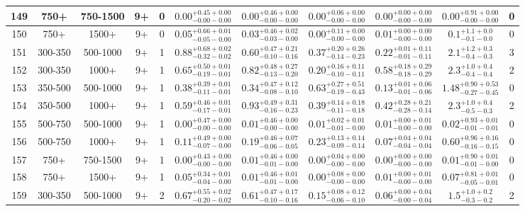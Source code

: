 \documentclass[11pt, oneside]{article}
\begin{document}
\begin{table}
{\begin{tabular}{ |c|c|c|c|c||c|c|c|c||c|c| }
149 & 750+ & 750-1500 & 9+ & 0 & $0.00^{+0.45+0.00}_{-0.00-0.00}$ & $0.00^{+0.46+0.00}_{-0.00-0.00}$ & $0.00^{+0.06+0.00}_{-0.00-0.00}$ & $0.00^{+0.00+0.00}_{-0.00-0.00}$ & $0.00^{+0.91+0.00}_{-0.00-0.00}$ & 0 \\ \hline
150 & 750+ & 1500+ & 9+ & 0 & $0.05^{+0.66+0.01}_{-0.05-0.00}$ & $0.03^{+0.46+0.02}_{-0.03-0.00}$ & $0.00^{+0.11+0.00}_{-0.00-0.00}$ & $0.01^{+0.00+0.00}_{-0.00-0.00}$ & $0.1^{+1.1+0.0}_{-0.1-0.0}$ & 0 \\ \hline
151 & 300-350 & 500-1000 & 9+ & 1 & $0.88^{+0.68+0.02}_{-0.32-0.02}$ & $0.60^{+0.47+0.21}_{-0.10-0.16}$ & $0.37^{+0.20+0.26}_{-0.14-0.23}$ & $0.22^{+0.01+0.11}_{-0.01-0.11}$ & $2.1^{+1.2+0.3}_{-0.4-0.3}$ & 3 \\ \hline
152 & 300-350 & 1000+ & 9+ & 1 & $0.65^{+0.50+0.01}_{-0.19-0.01}$ & $0.82^{+0.48+0.27}_{-0.13-0.20}$ & $0.20^{+0.16+0.11}_{-0.10-0.11}$ & $0.58^{+0.18+0.29}_{-0.18-0.29}$ & $2.3^{+1.0+0.4}_{-0.4-0.4}$ & 2 \\ \hline
153 & 350-500 & 500-1000 & 9+ & 1 & $0.38^{+0.39+0.01}_{-0.11-0.01}$ & $0.34^{+0.47+0.12}_{-0.08-0.10}$ & $0.63^{+0.27+0.51}_{-0.19-0.43}$ & $0.13^{+0.01+0.06}_{-0.01-0.06}$ & $1.48^{+0.90+0.53}_{-0.27-0.45}$ & 0 \\ \hline
154 & 350-500 & 1000+ & 9+ & 1 & $0.59^{+0.46+0.01}_{-0.17-0.01}$ & $0.93^{+0.49+0.31}_{-0.16-0.23}$ & $0.39^{+0.14+0.18}_{-0.11-0.18}$ & $0.42^{+0.28+0.21}_{-0.28-0.14}$ & $2.3^{+1.0+0.4}_{-0.5-0.3}$ & 2 \\ \hline
155 & 500-750 & 500-1000 & 9+ & 1 & $0.00^{+0.47+0.00}_{-0.00-0.00}$ & $0.01^{+0.46+0.00}_{-0.00-0.00}$ & $0.01^{+0.02+0.01}_{-0.01-0.00}$ & $0.01^{+0.00+0.01}_{-0.00-0.00}$ & $0.02^{+0.93+0.01}_{-0.01-0.01}$ & 0 \\ \hline
156 & 500-750 & 1000+ & 9+ & 1 & $0.11^{+0.49+0.00}_{-0.07-0.00}$ & $0.19^{+0.46+0.07}_{-0.06-0.05}$ & $0.23^{+0.13+0.14}_{-0.09-0.14}$ & $0.07^{+0.04+0.04}_{-0.04-0.04}$ & $0.60^{+0.96+0.16}_{-0.16-0.15}$ & 0 \\ \hline
157 & 750+ & 750-1500 & 9+ & 1 & $0.00^{+0.43+0.00}_{-0.00-0.00}$ & $0.01^{+0.46+0.00}_{-0.01-0.00}$ & $0.00^{+0.04+0.00}_{-0.00-0.00}$ & $0.00^{+0.00+0.00}_{-0.00-0.00}$ & $0.01^{+0.90+0.01}_{-0.01-0.00}$ & 0 \\ \hline
158 & 750+ & 1500+ & 9+ & 1 & $0.05^{+0.34+0.01}_{-0.04-0.00}$ & $0.01^{+0.46+0.01}_{-0.01-0.00}$ & $0.00^{+0.08+0.00}_{-0.00-0.00}$ & $0.01^{+0.00+0.01}_{-0.00-0.00}$ & $0.07^{+0.81+0.01}_{-0.05-0.01}$ & 0 \\ \hline
159 & 300-350 & 500-1000 & 9+ & 2 & $0.67^{+0.55+0.02}_{-0.20-0.02}$ & $0.61^{+0.47+0.17}_{-0.10-0.16}$ & $0.15^{+0.08+0.12}_{-0.06-0.10}$ & $0.06^{+0.00+0.04}_{-0.00-0.04}$ & $1.5^{+1.0+0.2}_{-0.3-0.2}$ & 2 \\ \hline

\end{tabular}}
\end{table}
\end{document}
